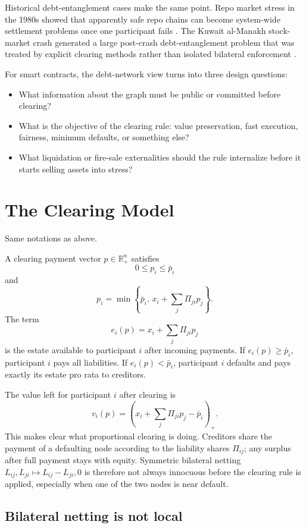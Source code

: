\documentclass[11pt,oneside]{article}
\newcommand{\R}{\mathbb{R}}
\newcommand{\barp}{\bar p}
\newcommand{\estate}{e}
\begin{document}
Historical debt-entanglement cases make the same point. Repo market stress in
the 1980s showed that apparently safe repo chains can become system-wide
settlement problems once one participant fails \cite{garbade}. The Kuwait
al-Manakh stock-market crash generated a large post-crash debt-entanglement
problem that was treated by explicit clearing methods rather than isolated
bilateral enforcement \cite{elimam1997solution}.

For smart contracts, the debt-network view turns into three design questions:

\begin{itemize}[leftmargin=1.5em]
  \item What information about the graph must be public or committed before
  clearing?
  \item What is the objective of the clearing rule: value preservation, fast
  execution, fairness, minimum defaults, or something else?
  \item What liquidation or fire-sale externalities should the rule internalize
  before it starts selling assets into stress?
\end{itemize}

\section{The Clearing Model}

Same notations as above.

A clearing payment vector $p \in \R_+^n$ satisfies
\[
  0 \leq p_i \leq \barp_i
\]
and
\[
  p_i =
  \min\left\{
    \barp_i,\,
    x_i + \sum_j \Pi_{ji}p_j
  \right\}.
\]
The term
\[
  \estate_i(p) = x_i + \sum_j \Pi_{ji}p_j
\]
is the estate available to participant $i$ after incoming payments. If
$\estate_i(p) \geq \barp_i$, participant $i$ pays all liabilities. If
$\estate_i(p)<\barp_i$, participant $i$ defaults and pays exactly its estate
pro rata to creditors.

The value left for participant $i$ after clearing is
\[
  v_i(p)=
  \left(x_i+\sum_j \Pi_{ji}p_j-\barp_i\right)_+.
\]
This makes clear what proportional clearing is doing. Creditors share the
payment of a defaulting node according to the liability shares $\Pi_{ij}$; any
surplus after full payment stays with equity. Symmetric bilateral netting
$L_{ij},L_{ji}\mapsto L_{ij}-L_{ji},0$ is therefore not always innocuous before
the clearing rule is applied, especially when one of the two nodes is near
default.

\subsection{Bilateral netting is not local}
\end{document}
